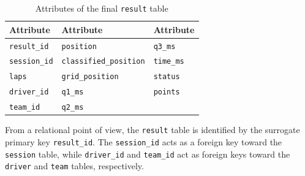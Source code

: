 \documentclass[12pt,a4paper]{article}
\begin{document}
	\begin{table}[H]
		\centering
		\caption{Attributes of the final \texttt{result} table}
		\renewcommand{\arraystretch}{1.15}
		\begin{tabularx}{0.95\textwidth}{>{\raggedright\arraybackslash}X >{\raggedright\arraybackslash}X >{\raggedright\arraybackslash}X}
			\toprule
			\textbf{Attribute} & \textbf{Attribute} & \textbf{Attribute} \\
			\midrule
			\texttt{result\_id}            & \texttt{position}              & \texttt{q3\_ms} \\
			\texttt{session\_id}         & \texttt{classified\_position}  & \texttt{time\_ms} \\
			\texttt{laps}                & \texttt{grid\_position}        & \texttt{status} \\
			\texttt{driver\_id}            & \texttt{q1\_ms}                & \texttt{points} \\
			\texttt{team\_id}              & \texttt{q2\_ms}                &  \\
			\bottomrule
		\end{tabularx}
	\end{table}
	
	From a relational point of view, the \texttt{result} table is identified by the surrogate primary key \texttt{result\_id}.
	The \texttt{session\_id} acts as a foreign key toward the \texttt{session} table, while \texttt{driver\_id} and \texttt{team\_id} act as foreign keys toward the \texttt{driver} and \texttt{team} tables, respectively.
	
\end{document}
